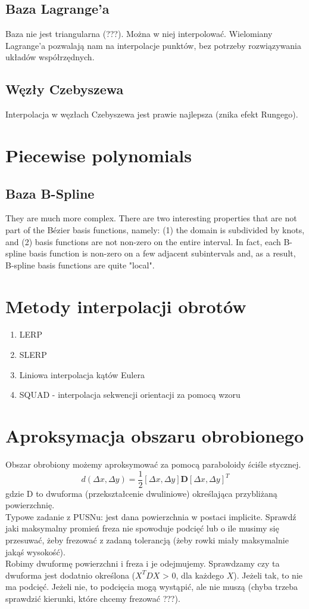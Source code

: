 \documentclass[12pt]{article}
\begin{document}
\subsection{Baza Lagrange'a}
Baza nie jest triangularna (???). Można w niej interpolować.
Wielomiany Lagrange'a pozwalają nam na interpolacje punktów, bez potrzeby rozwiązywania układów współrzędnych.
\subsection{Węzły Czebyszewa}
Interpolacja w węzłach Czebyszewa jest prawie najlepsza (znika efekt Rungego).

\section{Piecewise polynomials}
\subsection{Baza B-Spline}
They are much more complex. There are two interesting properties that are not part of the Bézier basis functions, namely: (1) the domain is subdivided by knots, and (2) basis functions are not non-zero on the entire interval. In fact, each B-spline basis function is non-zero on a few adjacent subintervals and, as a result, B-spline basis functions are quite "local".

\setcounter{section}{22}
\section{Metody interpolacji obrotów}
\begin{enumerate}
	\item LERP
	\item SLERP
	\item Liniowa interpolacja kątów Eulera
	\item SQUAD - interpolacja sekwencji orientacji za pomocą wzoru
\end{enumerate}

\section{Aproksymacja obszaru obrobionego}
Obszar obrobiony możemy aproksymować za pomocą paraboloidy ściśle stycznej. 
$$d(\Delta x, \Delta y) = \frac{1}{2} [\Delta x, \Delta y] \textbf{D}  [\Delta x, \Delta y]^{T}$$
gdzie D to dwuforma (przekształcenie dwuliniowe) określająca przybliżaną powierzchnię.\\
Typowe zadanie z PUSNu: jest dana powierzchnia w postaci implicite. Sprawdź jaki maksymalny promień freza nie spowoduje podcięć lub o ile musimy się przesuwać, żeby frezować z zadaną tolerancją (żeby rowki miały maksymalnie jakąś wysokość).\\
Robimy dwuformę powierzchni i freza i je odejmujemy. Sprawdzamy czy ta dwuforma jest dodatnio określona ($X^{T}DX$ > 0, dla każdego $X$). Jeżeli tak, to nie ma podcięć. Jeżeli nie, to podcięcia mogą wystąpić, ale nie muszą (chyba trzeba sprawdzić kierunki, które chcemy frezować ???).
 
\end{document}
